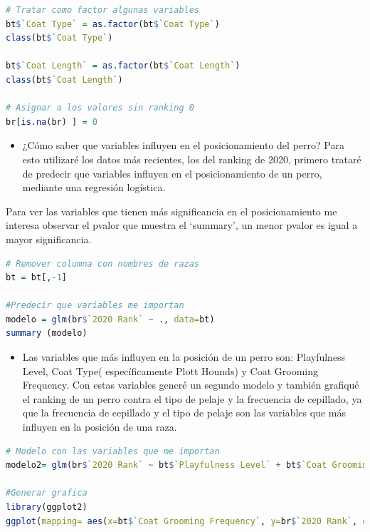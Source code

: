 \documentclass[
]{article}
\providecommand{\tightlist}{%
  \setlength{\itemsep}{0pt}\setlength{\parskip}{0pt}}
\begin{document}
\begin{lstlisting}[language=R]
# Tratar como factor algunas variables
bt$`Coat Type` = as.factor(bt$`Coat Type`)
class(bt$`Coat Type`)

bt$`Coat Length` = as.factor(bt$`Coat Length`)
class(bt$`Coat Length`)

# Asignar a los valores sin ranking 0
br[is.na(br) ] = 0
\end{lstlisting}

\begin{itemize}
\tightlist
\item
  ¿Cómo saber que variables influyen en el posicionamiento del perro?
  Para esto utilizaré los datos más recientes, los del ranking de 2020,
  primero trataré de predecir que variables influyen en el
  posicionamiento de un perro, mediante una regresión logística.
\end{itemize}

Para ver las variables que tienen más significancia en el
posicionamiento me interesa observar el pvalor que muestra el `summary',
un menor pvalor es igual a mayor significancia.

\begin{lstlisting}[language=R]
# Remover columna con nombres de razas
bt = bt[,-1]

#Predecir que variables me importan
modelo = glm(br$`2020 Rank` ~ ., data=bt)
summary (modelo)
\end{lstlisting}

\begin{itemize}
\tightlist
\item
  Las variables que más influyen en la posición de un perro son:
  Playfulness Level, Coat Type( específicamente Plott Hounds) y Coat
  Grooming Frequency. Con estas variables generé un segundo modelo y
  también grafiqué el ranking de un perro contra el tipo de pelaje y la
  frecuencia de cepillado, ya que la frecuencia de cepillado y el tipo
  de pelaje son las variables que más influyen en la posición de una
  raza.
\end{itemize}

\begin{lstlisting}[language=R]
# Modelo con las variables que me importan
modelo2= glm(br$`2020 Rank` ~ bt$`Playfulness Level` + bt$`Coat Grooming Frequency` + bt$`Coat Type`)

#Generar grafica
library(ggplot2)
ggplot(mapping= aes(x=bt$`Coat Grooming Frequency`, y=br$`2020 Rank`, colour= bt$`Coat Type`))+ geom_point() + labs (y= "Ranking 2020", x = "Frecuencia de cepillado") + labs(color = "Tipo de pelo")
\end{lstlisting}
\end{document}
